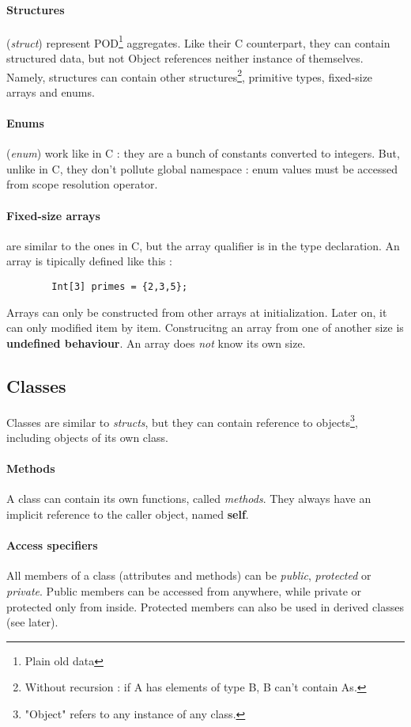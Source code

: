 \documentclass[a4paper, 12pt]{article}
\begin{document}
	\paragraph{Structures}(\textit{struct}) represent POD\footnote{Plain old data} aggregates. Like their C counterpart, they can contain structured data, but not Object references neither instance of themselves. Namely, structures can contain other structures\footnote{Without recursion : if A has elements of type B, B can't contain As.}, primitive types, fixed-size arrays and enums.
	
	\paragraph{Enums}(\textit{enum}) work like in C : they are a bunch of constants converted to integers. But, unlike in C, they don't pollute global namespace : enum values must be accessed from scope resolution operator.
	
	\paragraph{Fixed-size arrays} are similar to the ones in C, but the array qualifier is in the type declaration. An array is tipically defined like this : 
	\begin{verbatim}
		Int[3] primes = {2,3,5};
	\end{verbatim}
	Arrays can only be constructed from other arrays at initialization. Later on, it can only modified item by item. Construcitng an array from one of another size is \textbf{undefined behaviour}.
	An array does \textit{not} know its own size.
	
	\subsection{Classes}
	Classes are similar to \textit{structs}, but they can contain reference to objects\footnote{"Object" refers to any instance of any class.}, including objects of its own class.
	\paragraph{Methods}
	A class can contain its own functions, called \textit{methods}. They always have an implicit reference to the caller object, named \textbf{self}.
	\paragraph{Access specifiers}
	All members of a class (attributes and methods) can be \textit{public}, \textit{protected} or \textit{private}. Public members can be accessed from anywhere, while private or protected only from inside. Protected members can also be used in derived classes (see later).
\end{document}
